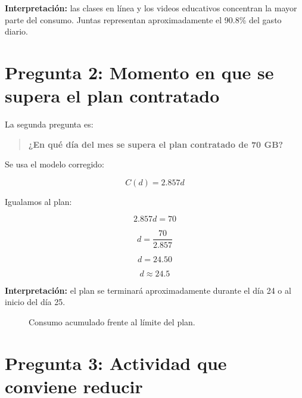 \documentclass[12pt,a4paper]{article}
\begin{document}
\begin{center}
		\textbf{Interpretación:} las clases en línea y los videos educativos concentran la mayor parte del consumo. Juntas representan aproximadamente el 90.8\% del gasto diario.
		
		\section{Pregunta 2: Momento en que se supera el plan contratado}
		
		La segunda pregunta es:
		
		\begin{quote}
			\textbf{¿En qué día del mes se supera el plan contratado de 70 GB?}
		\end{quote}
		
		Se usa el modelo corregido:
		
		\[
		C(d)=2.857d
		\]
		
		Igualamos al plan:
		
		\[
		2.857d=70
		\]
		
		\[
		d=\frac{70}{2.857}
		\]
		
		\[
		d=24.50
		\]
		
		\[
		\boxed{d\approx24.5}
		\]
		
		\textbf{Interpretación:} el plan se terminará aproximadamente durante el día 24 o al inicio del día 25.
		
		\begin{figure}[H]
			\centering
			\caption{Consumo acumulado frente al límite del plan.}
		\end{figure}
		
		\section{Pregunta 3: Actividad que conviene reducir}
		

\end{center}
\end{document}
